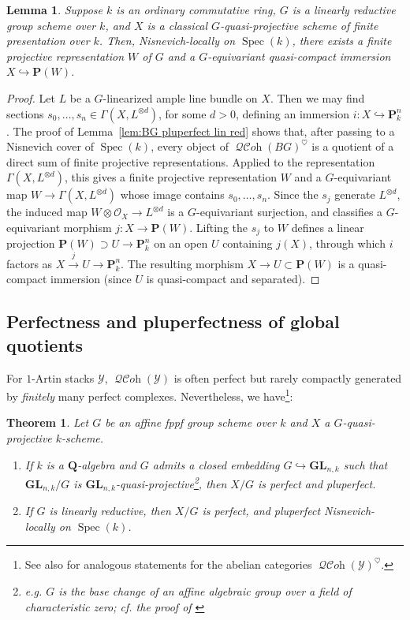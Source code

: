 \documentclass[12pt, oneside]{amsart}
\numberwithin{equation}{section}
\newtheorem{theorem}[subsubsection]{Theorem}
\newtheorem{lemma}[subsubsection]{Lemma}
\theoremstyle{remark}
\theoremstyle{plain}
\DeclareMathOperator{\QCOH}{\mathcal{QC}\textit{oh}}
\newcommand{\OO}{\mathcal{O}}
\newcommand{\YY}{\mathcal{Y}}
\DeclareMathOperator{\spc}{Spec}
\newcommand{\GL}{\mathbf{GL}}
\newcommand{\bQ}{\mathbf{Q}}
\begin{document}
\begin{lemma}\label{lem:VarG projective embedding}
  Suppose $k$ is an ordinary commutative ring, $G$ is a linearly reductive group scheme over $k$, and $X$ is a classical $G$-quasi-projective scheme of finite presentation over $k$.
  Then, Nisnevich-locally on $\spc(k)$, there exists a finite projective representation $W$ of $G$ and a $G$-equivariant quasi-compact immersion $X \hookrightarrow \mathbf{P}(W)$.
\end{lemma}
\begin{proof}
  Let $L$ be a $G$-linearized ample line bundle on $X$.
  Then we may find sections $s_0, \ldots, s_n \in \Gamma(X, L^{\otimes d})$, for some $d > 0$, defining an immersion $i : X \hookrightarrow \mathbf{P}^n_{k}$.
  The proof of Lemma~\ref{lem:BG pluperfect lin red} shows that, after passing to a Nisnevich cover of $\spc(k)$, every object of $\QCOH(BG)^\heartsuit$ is a quotient of a direct sum of finite projective representations.
  Applied to the representation $\Gamma(X, L^{\otimes d})$, this gives a finite projective representation $W$ and a $G$-equivariant map $W \to \Gamma(X, L^{\otimes d})$ whose image contains $s_0, \ldots, s_n$.
  Since the $s_j$ generate $L^{\otimes d}$, the induced map $W \otimes \OO_{X} \to L^{\otimes d}$ is a $G$-equivariant surjection, and classifies a $G$-equivariant morphism $j : X \to \mathbf{P}(W)$.
  Lifting the $s_j$ to $W$ defines a linear projection $\mathbf{P}(W) \supset U \to \mathbf{P}^n_{k}$ on an open $U$ containing $j(X)$, through which $i$ factors as $X \xrightarrow{j} U \to \mathbf{P}^n_{k}$.
  The resulting morphism $X \to U \subset \mathbf{P}(W)$ is a quasi-compact immersion (since $U$ is quasi-compact and separated).
\end{proof}

\subsection{Perfectness and pluperfectness of global quotients}

For $1$-Artin stacks $\YY$, $\QCOH(\YY)$ is often perfect but rarely compactly generated by \emph{finitely} many perfect complexes. Nevertheless, we have\footnote{%
  See also \cite{DeligneMilne,Gross} for analogous statements for the abelian categories $\QCOH(\YY)^\heartsuit$.
}:

\begin{theorem}\label{thm:pluperfect quotient}
Let $G$ be an affine fppf group scheme over $k$ and $X$ a $G$-quasi-projective $k$-scheme.
\begin{enumerate}
\item If $k$ is a $\bQ$-algebra and $G$ admits a closed embedding $G \hookrightarrow \GL_{n,k}$ such that $\GL_{n,k}/G$ is $\GL_{n,k}$-quasi-projective\footnote{%
  e.g. $G$ is the base change of an affine algebraic group over a field of characteristic zero; cf. the proof of \cite[Cor.~3.22]{BFN}
}, then $X/G$ is perfect and pluperfect.
\item If $G$ is linearly reductive, then $X/G$ is perfect, and pluperfect Nisnevich-locally on $\spc(k)$.
\end{enumerate}
\end{theorem}
\end{document}
